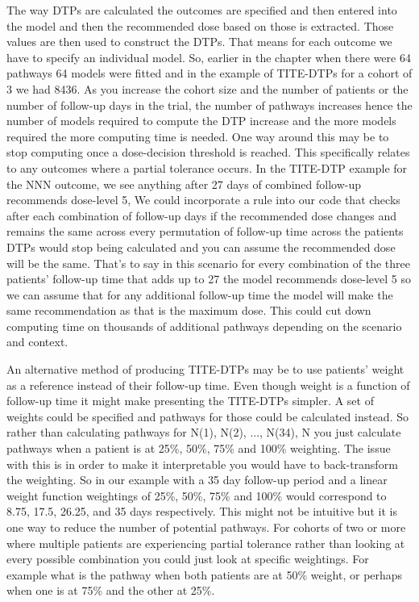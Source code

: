 The way DTPs are calculated the outcomes are specified and then entered into the model and then the recommended dose based on those is extracted. Those values are then used to construct the DTPs. That means for each outcome we have to specify an individual model. So, earlier in the chapter when there were 64 pathways 64 models were fitted and in the example of TITE-DTPs for a cohort of 3 we had 8436. As you increase the cohort size and the number of patients or the number of follow-up days in the trial, the number of pathways increases hence the number of models required to compute the DTP increase and the more models required the more computing time is needed. One way around this may be to stop computing once a dose-decision threshold is reached. This specifically relates to any outcomes where a partial tolerance occurs.  In the TITE-DTP example for the NNN outcome, we see anything after 27 days of combined follow-up recommends dose-level 5, We could incorporate a rule into our code that checks after each combination of follow-up days if the recommended dose changes and remains the same across every permutation of follow-up time across the patients DTPs would stop being calculated and you can assume the recommended dose will be the same. That's to say in this scenario for every combination of the three patients' follow-up time that adds up to 27 the model recommends dose-level 5 so we can assume that for any additional follow-up time the model will make the same recommendation as that is the maximum dose. This could cut down computing time on thousands of additional pathways depending on the scenario and context. 

An alternative method of producing TITE-DTPs may be to use patients' weight as a reference instead of their follow-up time. Even though weight is a function of follow-up time it might make presenting the TITE-DTPs simpler. A set of weights could be specified and pathways for those could be calculated instead. So rather than calculating pathways for N(1), N(2), ..., N(34), N you just calculate pathways when a patient is at 25\%, 50\%, 75\% and 100\% weighting. The issue with this is in order to make it interpretable you would have to back-transform the weighting. So in our example with a 35 day follow-up period and a linear weight function weightings of 25\%, 50\%, 75\% and 100\% would correspond to 8.75, 17.5, 26.25, and 35 days respectively. This might not be intuitive but it is one way to reduce the number of potential pathways. For cohorts of two or more where multiple patients are experiencing partial tolerance rather than looking at every possible combination you could just look at specific weightings. For example what is the pathway when both patients are at 50\% weight, or perhaps when one is at 75\% and the other at 25\%.  

